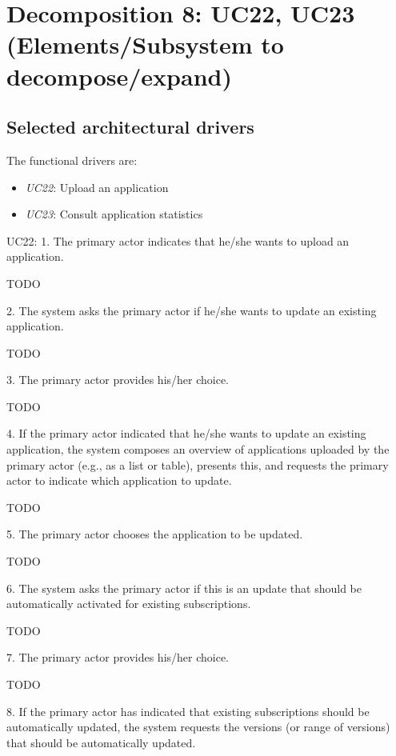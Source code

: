 \section{Decomposition 8: UC22, UC23 (Elements/Subsystem to decompose/expand)}


\subsection{Selected architectural drivers}
    The functional drivers are:
    \begin{itemize}
        \item \emph{UC22}: Upload an application  \\
        \item \emph{UC23}: Consult application statistics  \\
    \end{itemize}

    UC22:
        1. The primary actor indicates that he/she wants to upload an application.

            TODO

        2. The system asks the primary actor if he/she wants to update an existing application.

            TODO

        3. The primary actor provides his/her choice.

            TODO

        4. If the primary actor indicated that he/she wants to update an existing application, the system composes an overview of applications uploaded by the primary actor (e.g., as a list or table), presents this, and requests the primary actor to indicate which application to update.

            TODO

        5. The primary actor chooses the application to be updated.

            TODO

        6. The system asks the primary actor if this is an update that should be automatically activated for existing subscriptions.

            TODO

        7. The primary actor provides his/her choice.

            TODO

        8. If the primary actor has indicated that existing subscriptions should be automatically updated, the system requests the versions (or range of versions) that should be automatically updated.

